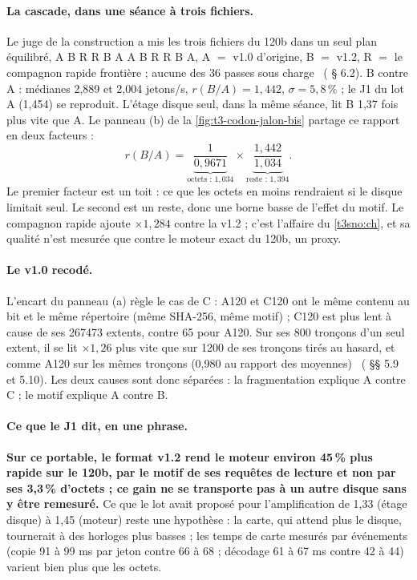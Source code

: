 \paragraph{La cascade, dans une séance à trois fichiers.} Le juge de la construction a mis les trois fichiers du 120b dans un seul plan équilibré, A B R R B A A B R R B A, A $=$ v1.0 d'origine, B $=$ v1.2, R $=$ le compagnon rapide frontière ; aucune des 36 passes sous charge \mes~( § 6.2). B contre A : médianes 2,889 et 2,004 jetons/s, $r(B/A) = 1{,}442$, $\sigma = 5{,}8\,\%$ ; le J1 du lot A (1,454) se reproduit. L'étage disque seul, dans la même séance, lit B 1,37 fois plus vite que A. Le panneau (b) de la \cref{fig:t3-codon-jalon-bis} partage ce rapport en deux facteurs \calc :
\[
r(B/A) = \underbrace{\frac{1}{0{,}9671}}_{\text{octets : } 1{,}034} \times \underbrace{\frac{1{,}442}{1{,}034}}_{\text{reste : } 1{,}394}.
\]
Le premier facteur est un toit : ce que les octets en moins rendraient si le disque limitait seul. Le second est un reste, donc une borne basse de l'effet du motif. Le compagnon rapide ajoute $\times 1{,}284$ contre la v1.2 ; c'est l'affaire du \cref{t3sno:ch}, et sa qualité n'est mesurée que contre le moteur exact du 120b, un proxy.

\paragraph{Le v1.0 recodé.} L'encart du panneau (a) règle le cas de C : A120 et C120 ont le même contenu au bit et le même répertoire (même SHA-256, même motif) ; C120 est plus lent à cause de ses \num{267473} extents, contre 65 pour A120. Sur ses 800 tronçons d'un seul extent, il se lit $\times 1{,}26$ plus vite que sur \num{1200} de ses tronçons tirés au hasard, et comme A120 sur les mêmes tronçons (0,980 au rapport des moyennes) \mes~( §§ 5.9 et 5.10). Les deux causes sont donc séparées : la fragmentation explique A contre C ; le motif explique A contre B.

\paragraph{Ce que le J1 dit, en une phrase.} \textbf{Sur ce portable, le format v1.2 rend le moteur environ 45\,\% plus rapide sur le 120b, par le motif de ses requêtes de lecture et non par ses 3,3\,\% d'octets ; ce gain ne se transporte pas à un autre disque sans y être remesuré.} Ce que le lot avait proposé pour l'amplification de 1,33 (étage disque) à 1,45 (moteur) reste une hypothèse : la carte, qui attend plus le disque, tournerait à des horloges plus basses ; les temps de carte mesurés par événements (copie 91 à 99 ms par jeton contre 66 à 68 ; décodage 61 à 67 ms contre 42 à 44) varient bien plus que les octets.

